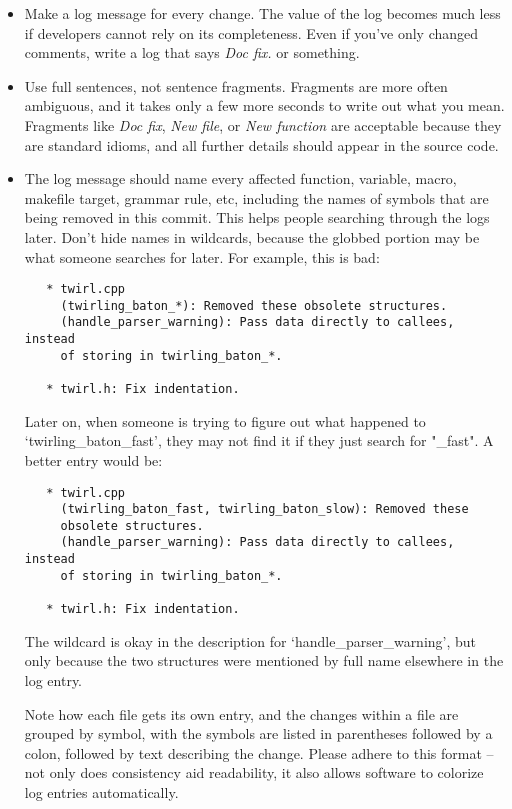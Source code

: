     \begin{itemize}
    \item Make a log message for every change.  The value of the log becomes
        much less if developers cannot rely on its completeness.  Even if
        you've only changed comments, write a log that says \emph{Doc fix.} or
        something.

    \item Use full sentences, not sentence fragments.  Fragments are more often
        ambiguous, and it takes only a few more seconds to write out what you
        mean.  Fragments like \emph{Doc fix}, \emph{New file}, or \emph{New function} are
        acceptable because they are standard idioms, and all further details
        should appear in the source code.

    \item The log message should name every affected function, variable, macro,
        makefile target, grammar rule, etc, including the names of symbols
        that are being removed in this commit.  This helps people searching
        through the logs later.  Don't hide names in wildcards, because the
        globbed portion may be what someone searches for later.  For example,
        this is bad:
\begin{Verbatim}
   * twirl.cpp
     (twirling_baton_*): Removed these obsolete structures.
     (handle_parser_warning): Pass data directly to callees, instead
     of storing in twirling_baton_*.

   * twirl.h: Fix indentation.
\end{Verbatim}
        Later on, when someone is trying to figure out what happened to
        `twirling\_baton\_fast', they may not find it if they just search for
        "\_fast".  A better entry would be:
\begin{Verbatim}
   * twirl.cpp
     (twirling_baton_fast, twirling_baton_slow): Removed these
     obsolete structures.
     (handle_parser_warning): Pass data directly to callees, instead
     of storing in twirling_baton_*.

   * twirl.h: Fix indentation.
\end{Verbatim}

        The wildcard is okay in the description for `handle\_parser\_warning',
        but only because the two structures were mentioned by full name
        elsewhere in the log entry.

        Note how each file gets its own entry, and the changes within a file
        are grouped by symbol, with the symbols are listed in parentheses
        followed by a colon, followed by text describing the change.  Please
        adhere to this format -- not only does consistency aid readability, it
        also allows software to colorize log entries automatically.


\end{itemize}
